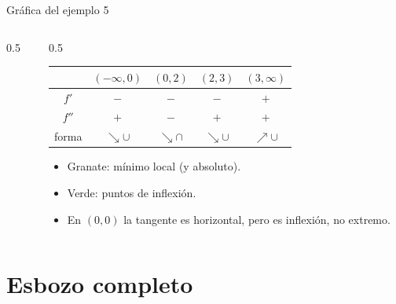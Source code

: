 \documentclass[10pt,aspectratio=169]{beamer}
\begin{document}
\begin{frame}{Gráfica del ejemplo 5}
  \begin{columns}
    \begin{column}{0.5\textwidth}
      \centering
    \end{column}
    \begin{column}{0.5\textwidth}
      \begin{center}
        \small
        \begin{tabular}{c|cccc}
          & $(-\infty,0)$ & $(0,2)$ & $(2,3)$ & $(3,\infty)$\\ \hline
          $f'$ & $-$ & $-$ & $-$ & $+$\\
          $f''$ & $+$ & $-$ & $+$ & $+$\\
          forma & $\searrow\cup$ & $\searrow\cap$ & $\searrow\cup$ & $\nearrow\cup$
        \end{tabular}
      \end{center}
      \begin{itemize}
        \item Granate: mínimo local (y absoluto).
        \item Verde: puntos de inflexión.
        \item En $(0,0)$ la tangente es horizontal, pero es inflexión, no extremo.
      \end{itemize}
    \end{column}
  \end{columns}
\end{frame}

\section{Esbozo completo}
\end{document}

